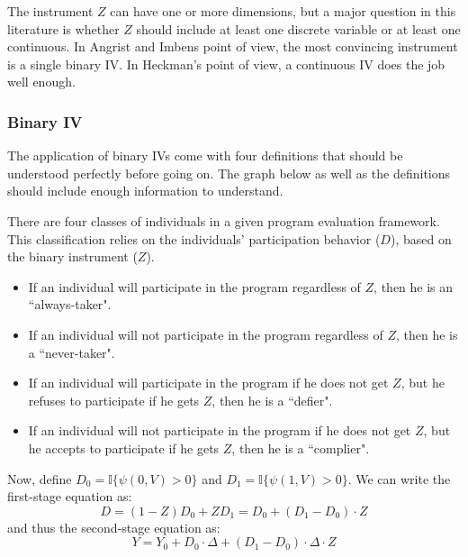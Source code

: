 The instrument $Z$ can have one or more dimensions, but a major question in this literature is whether $Z$ should include at least one discrete variable or at least one continuous. In Angrist and Imbens point of view, the most convincing instrument is a single binary IV. In Heckman's point of view, a continuous IV does the job well enough.

\subsubsection{Binary IV}

The application of binary IVs come with four definitions that should be understood perfectly before going on. The graph below as well as the definitions should include enough information to understand.

\begin{definition}
There are four classes of individuals in a given program evaluation framework. This classification relies on the individuals' participation behavior ($D$), based on the binary instrument ($Z$).
\begin{itemize}
\item If an individual will participate in the program regardless of $Z$, then he is an ``always-taker".
\item If an individual will not participate in the program regardless of $Z$, then he is a ``never-taker".
\item If an individual will participate in the program if he does not get $Z$, but he refuses to participate if he gets $Z$, then he is a ``defier".
\item If an individual will not participate in the program if he does not get $Z$, but he accepts to participate if he gets $Z$, then he is a ``complier".
\end{itemize}
\end{definition}
 
Now, define $D_0 = \mathbb{I}\{\psi(0,V)>0\}$ and $D_1 = \mathbb{I}\{\psi(1,V)>0\}$. We can write the first-stage equation as: $$D = (1 - Z)D_0 + ZD_1 = D_0 + (D_1 - D_0)\cdot Z $$ and thus the second-stage equation as: $$Y = Y_0 + D_0\cdot \Delta + (D_1 - D_0)\cdot \Delta\cdot Z $$


